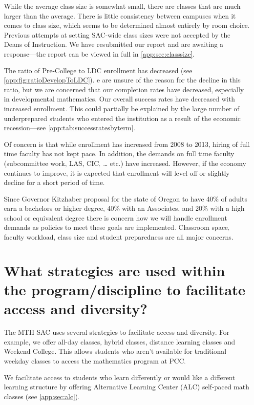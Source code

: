 While the average class size is somewhat small, there are classes that are much larger than the average. There is little consistency between campuses when it comes to class size, which seems to be determined almost entirely by room choice. Previous attempts at setting SAC-wide class sizes were not accepted by the Deans of Instruction. We have resubmitted our report and are awaiting a response---the report can be viewed in full in \vref{app:sec:classsize}.

The ratio of Pre-College to LDC enrollment has decreased (see \vref{app:fig:ratioDevelopToLDC}). e are unsure of the reason for the decline in this ratio, but we are concerned that our completion rates have decreased, especially in developmental mathematics. Our overall success rates have decreased with increased enrollment.  This could partially be explained by the large number of underprepared students who entered the institution as a result of the economic recession---see \vref{app:tab:successratesbyterm}.

Of concern is that while enrollment has increased from 2008 to 2013, hiring of full time faculty has not kept pace. In addition, the demands on full time faculty (subcommittee work, LAS, CIC, {\ldots} etc.) have increased.   However, if the economy continues to improve, it is expected that enrollment will level off or slightly decline for a short period of time.

Since Governor Kitzhaber proposal for the state of Oregon to have 40\% of adults earn a bachelors or higher degree, 40\% with an Associates, and 20\% with a high school or equivalent degree there is concern how we will handle enrollment demands as policies to meet these goals are implemented.    Classroom space, faculty workload, class size and student preparedness are all major concerns.

\section{What strategies are used within the program/discipline to facilitate access and diversity?}
The MTH SAC uses several strategies to facilitate access and diversity. For example, we offer all-day classes, hybrid classes, distance learning classes and Weekend College. This allows students who aren't available for traditional weekday classes to access the mathematics program at PCC. 

We facilitate access to students who learn differently or would like a different learning structure by offering  Alternative Learning Center (ALC) self-paced math classes (see \vref{app:sec:alc}).

